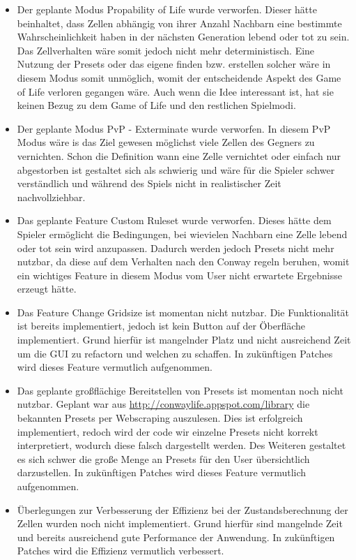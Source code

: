 \documentclass[12pt]{article}
\theoremstyle{plain}
\begin{document}
\begin{itemize}
\item
Der geplante Modus Propability of Life wurde verworfen. Dieser hätte beinhaltet, dass Zellen abhängig von ihrer Anzahl Nachbarn eine bestimmte Wahrscheinlichkeit haben in der nächsten Generation lebend oder tot zu sein. Das Zellverhalten wäre somit jedoch nicht mehr deterministisch. Eine Nutzung der Presets oder das eigene finden bzw. erstellen solcher wäre in diesem Modus somit unmöglich, womit der entscheidende Aspekt des Game of Life verloren gegangen wäre. Auch wenn die Idee interessant ist, hat sie keinen Bezug zu dem Game of Life und den restlichen Spielmodi.
\item
Der geplante Modus PvP - Exterminate wurde verworfen. In diesem PvP Modus wäre is das Ziel gewesen möglichst viele Zellen des Gegners zu vernichten. Schon die Definition wann eine Zelle vernichtet oder einfach nur abgestorben ist gestaltet sich als schwierig und wäre für die Spieler schwer verständlich und während des Spiels nicht in realistischer Zeit nachvollziehbar.
\item
Das geplante Feature Custom Ruleset wurde verworfen. Dieses hätte dem Spieler ermöglicht die Bedingungen, bei wievielen Nachbarn eine Zelle lebend oder tot sein wird anzupassen. Dadurch werden jedoch Presets nicht mehr nutzbar, da diese auf dem Verhalten nach den Conway regeln beruhen, womit ein wichtiges Feature in diesem Modus vom User nicht erwartete Ergebnisse erzeugt hätte.
\item
Das Feature Change Gridsize ist momentan nicht nutzbar. Die Funktionalität ist bereits implementiert, jedoch ist kein Button auf der Öberfläche implementiert. Grund hierfür ist mangelnder Platz und nicht ausreichend Zeit um die GUI zu refactorn und welchen zu schaffen. In zukünftigen Patches wird dieses Feature vermutlich aufgenommen.
\item
Das geplante großflächige Bereitstellen von Presets ist momentan noch nicht nutzbar. Geplant war aus \url{http://conwaylife.appspot.com/library} die bekannten Presets per Webscraping auszulesen. Dies ist erfolgreich implementiert, redoch wird der code wir einzelne Presets nicht korrekt interpretiert, wodurch diese falsch dargestellt werden.  Des Weiteren gestaltet es sich schwer die große Menge an Presets für den User übersichtlich darzustellen. In zukünftigen Patches wird dieses Feature vermutlich aufgenommen.
\item
Überlegungen zur Verbesserung der Effizienz bei der Zustandsberechnung der Zellen wurden noch nicht implementiert. Grund hierfür sind mangelnde Zeit und bereits ausreichend gute Performance der Anwendung. In zukünftigen Patches wird die Effizienz vermutlich verbessert.
\end{itemize}
\end{document}
